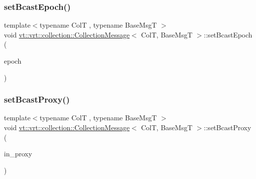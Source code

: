\mbox{\label{structvt_1_1vrt_1_1collection_1_1_collection_message_a513a81678ec43a110e39d957735831bd}} 
\subsubsection{\texorpdfstring{set\+Bcast\+Epoch()}{setBcastEpoch()}}
{\footnotesize\ttfamily template$<$typename ColT , typename Base\+MsgT $>$ \\
void \hyperlink{structvt_1_1vrt_1_1collection_1_1_collection_message}{vt\+::vrt\+::collection\+::\+Collection\+Message}$<$ ColT, Base\+MsgT $>$\+::set\+Bcast\+Epoch (\begin{DoxyParamCaption}\item[{\hyperlink{namespacevt_a985a5adf291c34a3ca263b3378388236}{Epoch\+Type} const \&}]{epoch }\end{DoxyParamCaption})}

\mbox{\label{structvt_1_1vrt_1_1collection_1_1_collection_message_a0f4be7193beb77e9862417a5eb6cff5a}} 
\subsubsection{\texorpdfstring{set\+Bcast\+Proxy()}{setBcastProxy()}}
{\footnotesize\ttfamily template$<$typename ColT , typename Base\+MsgT $>$ \\
void \hyperlink{structvt_1_1vrt_1_1collection_1_1_collection_message}{vt\+::vrt\+::collection\+::\+Collection\+Message}$<$ ColT, Base\+MsgT $>$\+::set\+Bcast\+Proxy (\begin{DoxyParamCaption}\item[{\hyperlink{namespacevt_a1b417dd5d684f045bb58a0ede70045ac}{Virtual\+Proxy\+Type} const \&}]{in\+\_\+proxy }\end{DoxyParamCaption})}

